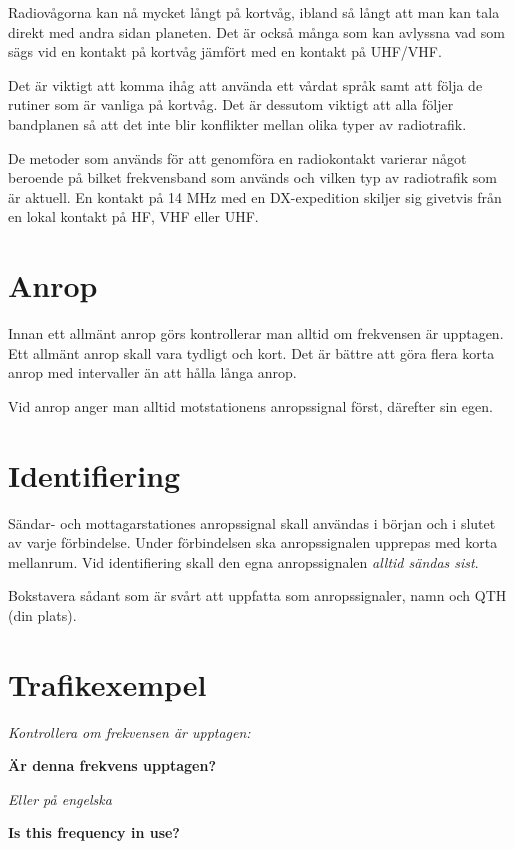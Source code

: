 Radiovågorna kan nå mycket långt på kortvåg, ibland så långt att man
kan tala direkt med andra sidan planeten. Det är också många som kan
avlyssna vad som sägs vid en kontakt på kortvåg jämfört med en kontakt
på UHF/VHF.

Det är viktigt att komma ihåg att använda ett vårdat språk samt att
följa de rutiner som är vanliga på kortvåg. Det är dessutom viktigt
att alla följer bandplanen så att det inte blir konflikter mellan
olika typer av radiotrafik.

De metoder som används för att genomföra en radiokontakt varierar
något beroende på bilket frekvensband som används och vilken typ av
radiotrafik som är aktuell. En kontakt på 14 MHz med en DX-expedition
skiljer sig givetvis från en lokal kontakt på HF, VHF eller UHF.

\section{Anrop}

Innan ett allmänt anrop görs kontrollerar man alltid om frekvensen är
upptagen. Ett allmänt anrop skall vara tydligt och kort. Det är bättre
att göra flera korta anrop med intervaller än att hålla långa anrop.

Vid anrop anger man alltid motstationens anropssignal först, därefter
sin egen.

\section{Identifiering}

Sändar- och mottagarstationes anropssignal skall användas i början och
i slutet av varje förbindelse. Under förbindelsen ska anropssignalen
upprepas med korta mellanrum. Vid identifiering skall den egna
anropssignalen \emph{alltid sändas sist}.

Bokstavera sådant som är svårt att uppfatta som anropssignaler, namn
och QTH (din plats).

\newpage

\section{Trafikexempel}

\textit{Kontrollera om frekvensen är upptagen:}

\textbf{Är denna frekvens upptagen?}

\textit{Eller på engelska}

\textbf{Is this frequency in use?}
  
